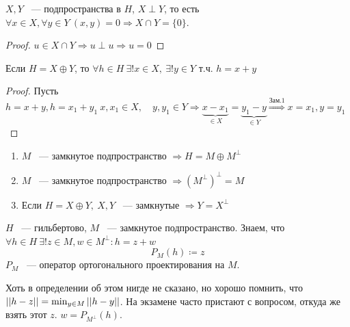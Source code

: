 \documentclass[document]{subfiles}
\begin{document}
\begin{remark}
    \item $X,Y$ ~--- подпространства в $H$, $X \perp Y$, то есть $\forall x \in X, \forall y \in Y \: (x,y) = 0 \Rightarrow X \cap Y = \{ 0 \}$.
\end{remark}
\begin{proof}
    $u \in X \cap Y \Rightarrow u \perp u \Rightarrow u = 0$
\end{proof}
\begin{remark}
    Если $H = X \oplus Y$, то $\forall h \in H  \: \exists! x \in X, \: \exists! y \in Y$ т.ч. $h = x + y$
\end{remark}
\begin{proof}
    Пусть $h = x + y, h = x_1 + y_1 \: x, x_1 \in X, \quad y, y_1 \in Y \Rightarrow \underbrace{x - x_1}_{\in X} = \underbrace{y_1-y}_{\in Y} \stackrel{\text{Зам.1}}{\Rightarrow} x = x_1, y = y_1$ 
\end{proof}
\begin{corollary}
    \begin{enumerate}
        \item $M$ ~--- замкнутое подпространство $\Rightarrow H = M \oplus M^\perp$ 
        \item $M$ ~--- замкнутое подпространство $\Rightarrow (M^\perp)^\perp = M $
        \item Если $H = X \oplus Y, \: X, Y$ ~--- замкнутые $\Rightarrow Y = X^\perp$
    \end{enumerate}
\end{corollary}

\begin{definition}
    $H$ ~--- гильбертово, $M$ ~--- замкнутое подпространство. Знаем, что $\forall h \in H \: \exists! z \in M, w \in M^\perp : h = z + w$
    \[ P_M(h) \coloneqq z \]
    $P_M$ ~--- оператор ортогонального проектирования на $M$. 
\end{definition}

Хоть в определении об этом нигде не сказано, но хорошо помнить, что $\left|\left| {h-z} \right| \right| = \min_{y \in M} \left|\left| {h-y} \right| \right|$.
На экзамене часто пристают с вопросом, откуда же взять этот $z$. $w = P_{M^\perp}(h)$.
\end{document}
